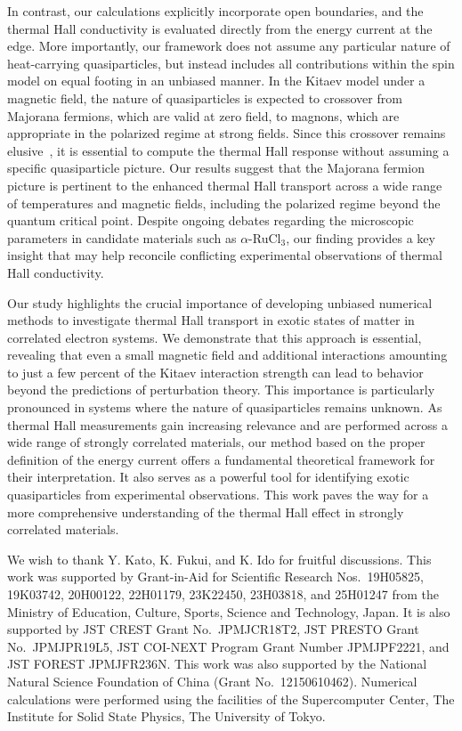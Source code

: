\documentclass[twocolumn,superscriptaddress,showpacs, longbibliography, aps, prx]{revtex4-2}
\begin{document}
In contrast, our calculations explicitly incorporate open boundaries, and the thermal Hall conductivity is evaluated directly from the energy current at the edge. 
More importantly, our framework does not assume any particular nature of heat-carrying quasiparticles, but instead includes all contributions within the spin model on equal footing in an unbiased manner. 
In the Kitaev model under a magnetic field, the nature of quasiparticles is expected to crossover from Majorana fermions, which are valid at zero field, to magnons, which are appropriate in the polarized regime at strong fields. 
Since this crossover remains elusive~\cite{WinterRMCHV2017,YoshitakeNKM2020}, it is essential to compute the thermal Hall response without assuming a specific quasiparticle picture. 
Our results suggest that the Majorana fermion picture is pertinent to the enhanced thermal Hall transport across a wide range of temperatures and magnetic fields, including the polarized regime beyond the quantum critical point. 
Despite ongoing debates regarding the microscopic parameters in candidate materials such as $\alpha$-RuCl$_3$, our finding provides a key insight that may help reconcile conflicting experimental observations of thermal Hall conductivity. 

Our study highlights the crucial importance of developing unbiased numerical methods to investigate thermal Hall transport in exotic states of matter in correlated electron systems. 
We demonstrate that this approach is essential, revealing that even a small magnetic field and additional interactions amounting to just a few percent of the Kitaev interaction strength can lead to behavior beyond the predictions of perturbation theory. 
This importance is particularly pronounced in systems where the nature of quasiparticles remains unknown. 
As thermal Hall measurements gain increasing relevance and are performed across a wide range of strongly correlated materials, our method based on the proper definition of the energy current offers a fundamental theoretical framework for their interpretation. 
It also serves as a powerful tool for identifying exotic quasiparticles from experimental observations. This work paves the way for a more comprehensive understanding of the thermal Hall effect in strongly correlated materials.

\begin{acknowledgments}
We wish to thank Y. Kato, K. Fukui, and K. Ido for fruitful discussions.
This work was supported by  Grant-in-Aid for Scientific Research
Nos.~19H05825, 19K03742, 20H00122, 	22H01179, 23K22450, 23H03818, and 25H01247 from the Ministry of Education, Culture, Sports, Science and Technology, Japan.
It is also supported by JST CREST Grant No.~JPMJCR18T2, JST PRESTO Grant No.~JPMJPR19L5, JST COI-NEXT Program Grant Number JPMJPF2221, and JST FOREST JPMJFR236N. This work was also supported by the National Natural Science Foundation of China (Grant No.~12150610462). Numerical calculations were performed using the facilities of the Supercomputer Center, The Institute for Solid State Physics, The University of Tokyo.
\end{acknowledgments}
\end{document}
